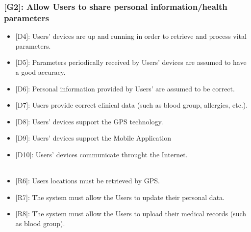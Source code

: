 \documentclass[12pt,a4paper]{article}
\begin{document}
	\subsubsection*{{[}{G2}{]}: Allow Users to share personal information/health parameters}
	\begin{itemize}
		\begin{itemize}
			\item {[D4]}: Users' devices are up and running in order to retrieve and process vital parameters.
			\item {[D5]}: Parameters periodically received by Users' devices are assumed to have a good accuracy.
			\item {[D6]}: Personal information provided by Users' are assumed to be correct.
			\item {[D7]}: Users provide correct clinical data (such as blood group, allergies, etc.).
			\item {[D8]}: Users' devices support the GPS technology.
			\item {[D9]}: Users' devices support the Mobile Application
			\item {[D10]}: Users' devices communicate throught the Internet.
			\\ \\
			\item {[R6]}: Users locations must be retrieved by GPS.
			\item {[R7]}: The system must allow the Users to update their personal data.
			\item {[R8]}: The system must allow the Users to upload their medical records (such as blood group).
		\end{itemize}
	\end{itemize}
\end{document}
